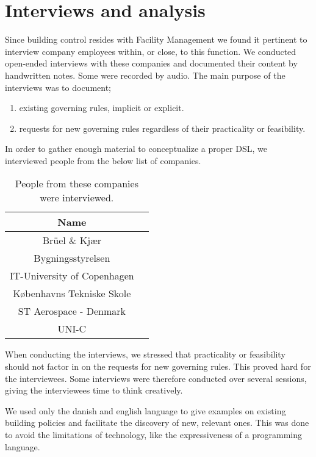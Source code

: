 \documentclass{llncs}
\begin{document}
\section{Interviews and analysis}\label{sec:interviews}
Since building control resides with Facility Management we found it pertinent to interview company employees within, or close, to this function. We conducted open-ended interviews with these companies and documented their content by handwritten notes. Some were recorded by audio. The main purpose of the interviews was to document;

\begin{enumerate}
	\item existing governing rules, implicit or explicit.
	\item requests for new governing rules regardless of their practicality or feasibility.
\end{enumerate}

In order to gather enough material to conceptualize a proper DSL, we interviewed people from the below list of companies.\\ 

\begin{table}[htdp]
\begin{center}
\begin{tabular}{|c|c|}
	\textbf{Name}\\
	\hline 
	Br\"{u}el \& Kj\ae r\\
	Bygningsstyrelsen\\
	IT-University of Copenhagen\\
	K\o benhavns Tekniske Skole\\
	ST Aerospace - Denmark\\
	UNI-C\\
\end{tabular}
\end{center}
\label{tab:interviewees}
\caption{People from these companies were interviewed.}
\end{table}%

When conducting the interviews, we stressed that practicality or feasibility should not factor in on the requests for new governing rules. This proved hard for the interviewees. Some interviews were therefore conducted over several sessions, giving the interviewees time to think creatively. 

We used only the danish and english language to give examples on existing building policies and facilitate the discovery of new, relevant ones. This was done to avoid the limitations of technology, like the expressiveness of a programming language.
\end{document}
